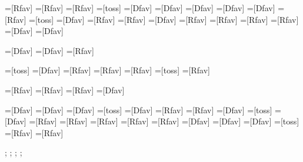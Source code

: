 

=[Rfav]	%
=[Rfav]	%
=[Rfav]	%
=[toss]	%
=[Dfav]	%
=[Dfav]	%
=[Dfav]	%
=[Dfav]	%
=[Dfav]	%
=[Rfav]	%
=[toss]	%
=[Dfav]	%
=[Rfav]	%
=[Rfav]	%
=[Dfav]	%
=[Rfav]	%
=[Rfav]	%
=[Rfav]	%
=[Rfav]	%
=[Dfav]	%
=[Dfav]	%

=[Dfav]	%
=[Dfav]	%
=[Rfav]	%

=[toss]	%
=[Dfav]	%
=[Rfav]	%
=[Rfav]	%
=[Rfav]	%
=[toss]	%
=[Rfav]	%

=[Rfav]	%
=[Rfav]	%
=[Rfav]	%
=[Dfav]	%

=[Dfav]	%
=[Dfav]	%
=[Dfav]	%
=[toss]	%
=[Dfav]	%
=[Rfav]	%
=[Rfav]	%
=[Dfav]	%
=[toss]	%
=[Dfav]	%
=[Rfav]	%
=[Rfav]	%
=[Rfav]	%
=[Rfav]	%
=[Rfav]	%
=[Dfav]	%
=[Dfav]	%
=[Dfav]	%
=[toss]	%
=[Rfav]	%
=[Rfav]	%




\def\Dfavcount{226};
\def\Dwincount{0};
\def\Rfavcount{219};
\def\Rwincount{0};
